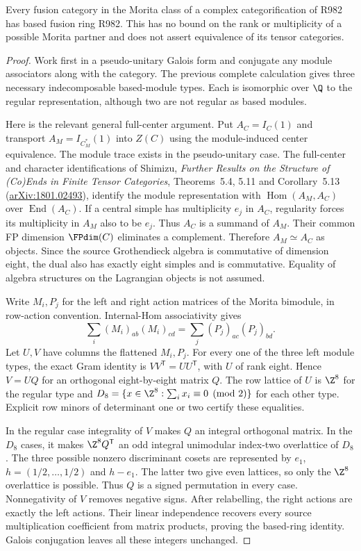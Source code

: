 \begin{proposition}
\label{prop:creative-r982-morita}
Every fusion category in the Morita class of a complex categorification
of R982 has based fusion ring R982. This has no bound on the rank or
multiplicity of a possible Morita partner and does not assert equivalence
of its tensor categories.
\end{proposition}
\begin{proof}
Work first in a pseudo-unitary Galois form and conjugate any module
associators along with the category. The previous complete calculation
gives three necessary indecomposable based-module types. Each is
isomorphic over $\Q$ to the regular representation, although two are
not regular as based modules.

Here is the relevant general full-center argument. Put
$A_C=I_C(1)$ and transport $A_M=I_{C_M^*}(1)$ into $Z(C)$ using the
module-induced center equivalence. The module trace exists in the
pseudo-unitary case. The full-center and character identifications of
Shimizu, \emph{Further Results on the Structure of (Co)Ends in Finite
Tensor Categories}, Theorems~5.4, 5.11 and Corollary~5.13
(\href{https://arxiv.org/pdf/1801.02493}{arXiv:1801.02493}), identify
the module representation with $\operatorname{Hom}(A_M,A_C)$ over
$\operatorname{End}(A_C)$.
If a central simple has multiplicity $e_j$ in $A_C$, regularity forces
its multiplicity in $A_M$ also to be $e_j$. Thus $A_C$ is a summand
of $A_M$. Their common FP dimension $\FPdim(C)$ eliminates a
complement. Therefore $A_M\simeq A_C$ as objects. Since the source
Grothendieck algebra is commutative of dimension eight, the dual also
has exactly eight simples and is commutative. Equality of algebra
structures on the Lagrangian objects is not assumed.

Write $M_i,P_j$ for the left and right action matrices of the Morita
bimodule, in row-action convention. Internal-Hom associativity gives
\[
 \sum_i(M_i)_{ab}(M_i)_{cd}
       =\sum_j(P_j)_{ac}(P_j)_{bd}.
\]
Let $U,V$ have columns the flattened $M_i,P_j$. For every one of
the three left module types, the exact Gram identity is
$VV^{\mathsf T}=UU^{\mathsf T}$, with $U$ of rank eight.
Hence $V=UQ$ for an orthogonal eight-by-eight matrix $Q$.
The row lattice of $U$ is $\Z^8$ for the regular type and
$D_8=\{x\in\Z^8:\sum_i x_i\equiv0\pmod2\}$ for each other
type. Explicit row minors of determinant one or two certify these
equalities.

In the regular case integrality of $V$ makes $Q$ an integral
orthogonal matrix. In the $D_8$ cases, it makes
$\Z^8Q^{\mathsf T}$ an odd integral unimodular index-two
overlattice of $D_8$. The three possible nonzero discriminant cosets
are represented by $e_1$, $h=(1/2,\ldots,1/2)$ and $h-e_1$.
The latter two give even lattices, so only the $\Z^8$ overlattice
is possible. Thus $Q$ is a signed permutation in every case.
Nonnegativity of $V$ removes negative signs. After relabelling, the
right actions are exactly the left actions. Their linear independence
recovers every source multiplication coefficient from matrix products,
proving the based-ring identity. Galois conjugation leaves all these
integers unchanged.
\end{proof}

